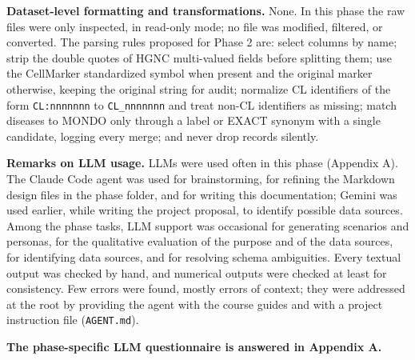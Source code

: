 \medskip\noindent\textbf{Dataset-level formatting and transformations.} None. In this phase the raw files were only inspected, in read-only mode; no file was modified, filtered, or converted. The parsing rules proposed for Phase 2 are: select columns by name; strip the double quotes of HGNC multi-valued fields before splitting them; use the CellMarker standardized symbol when present and the original marker otherwise, keeping the original string for audit; normalize CL identifiers of the form \texttt{CL:nnnnnnn} to \texttt{CL\_nnnnnnn} and treat non-CL identifiers as missing; match diseases to MONDO only through a label or EXACT synonym with a single candidate, logging every merge; and never drop records silently.

\medskip\noindent\textbf{Remarks on LLM usage.} LLMs were used often in this phase (Appendix A). The Claude Code agent was used for brainstorming, for refining the Markdown design files in the phase folder, and for writing this documentation; Gemini was used earlier, while writing the project proposal, to identify possible data sources. Among the phase tasks, LLM support was occasional for generating scenarios and personas, for the qualitative evaluation of the purpose and of the data sources, for identifying data sources, and for resolving schema ambiguities. Every textual output was checked by hand, and numerical outputs were checked at least for consistency. Few errors were found, mostly errors of context; they were addressed at the root by providing the agent with the course guides and with a project instruction file (\texttt{AGENT.md}).

\noindent\textbf{The phase-specific LLM questionnaire is answered in Appendix A.}
